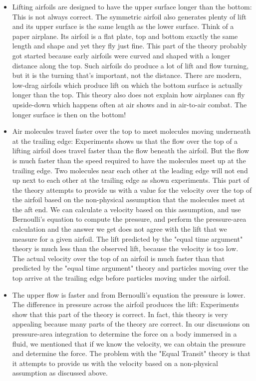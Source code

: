 	\begin{itemize}
		\item Lifting airfoils are designed to have the upper surface longer than the bottom: This is not always correct. The symmetric airfoil also generates plenty of lift and its upper surface is the same length as the lower surface. Think of a paper airplane. Its airfoil is a flat plate, top and bottom exactly the same length and shape and yet they fly just fine. This part of the theory probably got started because early airfoils were curved and shaped with a longer distance along the top. Such airfoils do produce a lot of lift and flow turning, but it is the turning that's important, not the distance. There are modern, low-drag airfoils which produce lift on which the bottom surface is actually longer than the top. This theory also does not explain how airplanes can fly upside-down which happens often at air shows and in air-to-air combat. The longer surface is then on the bottom!

		\item Air molecules travel faster over the top to meet molecules moving underneath at the trailing edge: Experiments shows us that the flow over the top of a lifting airfoil does travel faster than the flow beneath the airfoil. But the flow is much faster than the speed required to have the molecules meet up at the trailing edge. Two molecules near each other at the leading edge will not end up next to each other at the trailing edge as shown experiments. This part of the theory attempts to provide us with a value for the velocity over the top of the airfoil based on the non-physical assumption that the molecules meet at the aft end. We can calculate a velocity based on this assumption, and use Bernoulli's equation to compute the pressure, and perform the pressure-area calculation and the answer we get does not agree with the lift that we measure for a given airfoil. The lift predicted by the "equal time argument" theory is much less than the observed lift, because the velocity is too low. The actual velocity over the top of an airfoil is much faster than that predicted by the "equal time argument" theory and particles moving over the top arrive at the trailing edge before particles moving under the airfoil.

		\item The upper flow is faster and from Bernoulli's equation the pressure is lower. The difference in pressure across the airfoil produces the lift: Experiments show that this part of the theory is correct. In fact, this theory is very appealing because many parts of the theory are correct. In our discussions on pressure-area integration to determine the force on a body immersed in a fluid, we mentioned that if we know the velocity, we can obtain the pressure and determine the force. The problem with the "Equal Transit" theory is that it attempts to provide us with the velocity based on a non-physical assumption as discussed above.
	\end{itemize}
